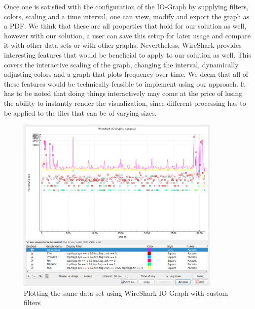 Once one is satisfied with the configuration of the IO-Graph by supplying filters, colors, scaling and a time interval, one can view, modify and export the graph as a PDF. We think that these are all properties that hold for our solution as well, however with our solution, a user can save this setup for later usage and compare it with other data sets or with other graphs. Nevertheless, WireShark provides interesting features that would be beneficial to apply to our solution as well. This covers the interactive scaling of the graph, changing the interval, dynamically adjusting colors and a graph that plots frequency over time. We deem that all of these features would be technically feasible to implement using our approach. It has to be noted that doing things interactively may come at the price of losing the ability to instantly render the visualization, since different processing has to be applied to the files that can be of varying sizes.

\begin{figure}[]
    \centering
    \includegraphics[width=10cm]{images/evaluation_wireshark_iograph_synflood.png}
    \caption{Plotting the same data set using WireShark IO Graph with custom filters}
    \label{fig:synvisualizationwireshark}
\end{figure}

